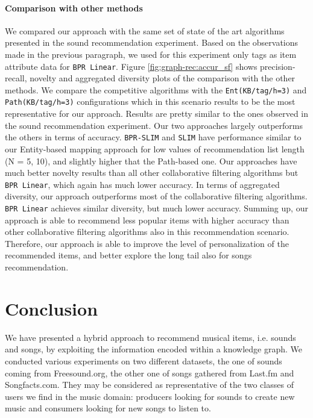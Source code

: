 \paragraph*{\textbf{Comparison with other methods}}\label{comp}
We compared our approach with the same set of state of the art algorithms presented in the sound recommendation experiment. Based on the observations made in the previous paragraph, we used for this experiment only tags as item attribute data for \texttt{BPR Linear}.
Figure \ref{fig:graph-rec:accur_sf} shows precision-recall, novelty and aggregated diversity plots of the comparison with the other methods. We compare the competitive algorithms with the \texttt{Ent(KB/tag/h=3)} and \texttt{Path(KB/tag/h=3)} configurations which in this scenario results to be the most representative for our approach. 
Results are pretty similar to the ones observed in the sound recommendation experiment. Our two approaches largely outperforms the others in terms of accuracy. \texttt{BPR-SLIM} and \texttt{SLIM} have performance similar to our Entity-based mapping approach for low values of recommendation list length (N = 5, 10), and slightly higher that the Path-based one. %
Our approaches have much better novelty results than all other collaborative filtering algorithms but \texttt{BPR Linear}, which again has much lower accuracy. In terms of aggregated diversity, our approach outperforms most of the collaborative filtering algorithms. \texttt{BPR Linear} achieves similar diversity, but much lower accuracy.
Summing up, our approach is able to recommend less popular items with higher accuracy than other collaborative filtering algorithms also in this recommendation scenario. Therefore, our approach is able to improve the level of personalization of the recommended items, and  better explore the long tail also for songs recommendation.



\section{Conclusion}
\label{sec:graph-rec:conclusion}
We have presented a hybrid approach to recommend musical items, i.e. sounds and songs, by exploiting the information encoded within a knowledge graph. We conducted various experiments on two different datasets, the one of sounds coming from Freesound.org, the other one of songs gathered from Last.fm and Songfacts.com. They may be considered as representative of the two classes of users we find in the music domain: producers looking for sounds to create new music and consumers looking for new songs to listen to.

